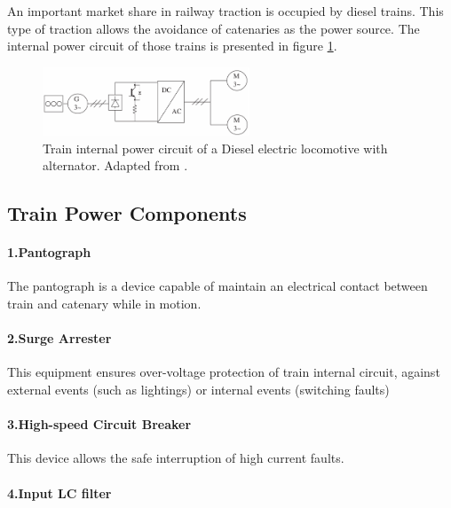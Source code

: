An important market share in railway traction is occupied by diesel trains. This type of traction allows the avoidance of catenaries as the power source. The internal power circuit of those trains is presented in figure \ref{fig:abad2016h}.

\begin{figure}[h!]
	\centering
	\includegraphics[width=0.55\textwidth,keepaspectratio]{figures/31.PowerS/abad2016h}
	\caption{Train internal power circuit of a Diesel electric locomotive with alternator. Adapted from \cite{abad2016}.}
	\label{fig:abad2016h}
\end{figure}


\subsection{Train Power Components}
\label{subs:314}
\paragraph{1.Pantograph\\}

	The pantograph is a device capable of maintain an electrical contact between train and catenary while in motion.
	
\paragraph{2.Surge Arrester\\}

	This equipment ensures over-voltage protection of train internal circuit, against external events (such as lightings) or internal events (switching faults)
	
\paragraph{3.High-speed Circuit Breaker\\}
	
	This device allows the safe interruption of high current faults.
	
\paragraph{4.Input LC filter\\}

